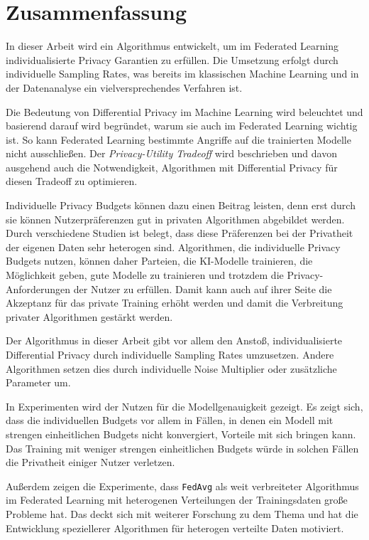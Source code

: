 \chapter{Zusammenfassung}

In dieser Arbeit wird ein Algorithmus entwickelt, um im Federated Learning individualisierte Privacy Garantien zu erfüllen. Die Umsetzung erfolgt durch individuelle Sampling Rates, was bereits im klassischen Machine Learning und in der Datenanalyse ein vielversprechendes Verfahren ist.

Die Bedeutung von Differential Privacy im Machine Learning wird beleuchtet und basierend darauf wird begründet, warum sie auch im Federated Learning wichtig ist. So kann Federated Learning bestimmte Angriffe auf die trainierten Modelle nicht ausschließen. Der \textit{Privacy-Utility Tradeoff} wird beschrieben und davon ausgehend auch die Notwendigkeit, Algorithmen mit Differential Privacy für diesen Tradeoff zu optimieren. 

Individuelle Privacy Budgets können dazu einen Beitrag leisten, denn erst durch sie können Nutzerpräferenzen gut in privaten Algorithmen abgebildet werden. Durch verschiedene Studien ist belegt, dass diese Präferenzen bei der Privatheit der eigenen Daten sehr heterogen sind. Algorithmen, die individuelle Privacy Budgets nutzen, können daher Parteien, die KI-Modelle trainieren, die Möglichkeit geben, gute Modelle zu trainieren und trotzdem die Privacy-Anforderungen der Nutzer zu erfüllen. Damit kann auch auf ihrer Seite die Akzeptanz für das private Training erhöht werden und damit die Verbreitung privater Algorithmen gestärkt werden.

Der Algorithmus in dieser Arbeit gibt vor allem den Anstoß, individualisierte Differential Privacy durch individuelle Sampling Rates umzusetzen. Andere Algorithmen setzen dies durch individuelle Noise Multiplier oder zusätzliche Parameter um.

In Experimenten wird der Nutzen für die Modellgenauigkeit gezeigt. Es zeigt sich, dass die individuellen Budgets vor allem in Fällen, in denen ein Modell mit strengen einheitlichen Budgets nicht konvergiert, Vorteile mit sich bringen kann. Das Training mit weniger strengen einheitlichen Budgets würde in solchen Fällen die Privatheit einiger Nutzer verletzen.

Außerdem zeigen die Experimente, dass \texttt{FedAvg} als weit verbreiteter Algorithmus im Federated Learning mit heterogenen Verteilungen der Trainingsdaten große Probleme hat. Das deckt sich mit weiterer Forschung zu dem Thema und hat die Entwicklung speziellerer Algorithmen für heterogen verteilte Daten motiviert.

